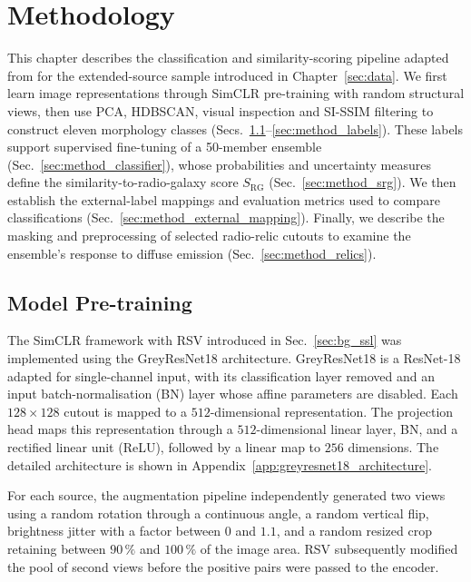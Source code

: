 \section{Methodology}
\label{sec:method}

This chapter describes the classification and similarity-scoring pipeline adapted from \citet{Nicolas2025} for the extended-source sample introduced in Chapter~\ref{sec:data}. We first learn image representations through SimCLR pre-training with random structural views, then use PCA, HDBSCAN, visual inspection and SI-SSIM filtering to construct eleven morphology classes (Secs.~\ref{sec:method_simclr}--\ref{sec:method_labels}). These labels support supervised fine-tuning of a 50-member ensemble (Sec.~\ref{sec:method_classifier}), whose probabilities and uncertainty measures define the similarity-to-radio-galaxy score \(S_\mathrm{RG}\) (Sec.~\ref{sec:method_srg}). We then establish the external-label mappings and evaluation metrics used to compare classifications (Sec.~\ref{sec:method_external_mapping}). Finally, we describe the masking and preprocessing of selected radio-relic cutouts to examine the ensemble's response to diffuse emission (Sec.~\ref{sec:method_relics}).

\subsection{Model Pre-training}
\label{sec:method_simclr}

The SimCLR framework with RSV introduced in Sec.~\ref{sec:bg_ssl} was implemented using the GreyResNet18 architecture.
GreyResNet18 is a ResNet-18 \citep{He2016} adapted for single-channel input, with its classification layer removed and
an input batch-normalisation (BN) layer whose affine parameters are disabled. Each \(128 \times 128\) cutout is mapped to a \(512\)-dimensional representation.
The projection head maps this representation through a \(512\)-dimensional linear layer, BN, and a rectified linear unit (ReLU), followed by a linear map to \(256\) dimensions.
The detailed architecture is shown in Appendix~\ref{app:greyresnet18_architecture}.

For each source, the augmentation pipeline independently generated two views using a random rotation through a continuous angle, a random vertical flip,
brightness jitter with a factor between \(0\) and \(1.1\), and a random resized crop retaining between \(90\,\%\) and \(100\,\%\) of the image area.
RSV subsequently modified the pool of second views before the positive pairs were passed to the encoder.

